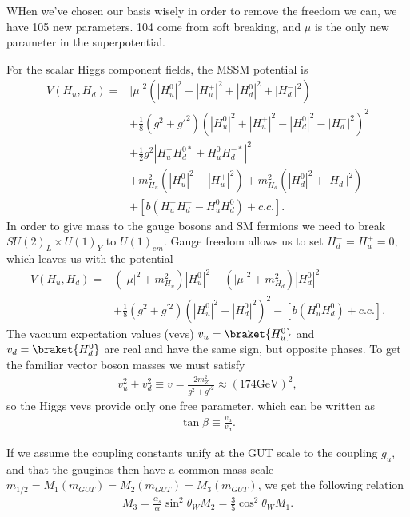 \documentclass[twoside,english]{uiofysmaster}
\begin{document}
WHen we've chosen our basis wisely in order to remove the freedom we can, we have 105 new parameters. 104 come from soft breaking, and $\mu$ is the only new parameter in the superpotential.

For the scalar Higgs component fields, the MSSM potential is
\begin{align*}
V(H_u, H_d) =& |\mu|^2 (|H_u^0|^2 + |H_u^+|^2 + |H_d^0|^2 + |H_d^-|^2)\\
&+ \frac{1}{8} (g^2 + g'^{2})(|H_u^0|^2 + |H_u^+|^2 - |H_d^0|^2 - |H_d^-|^2)^2\\
&+ \frac{1}{2} g^2 |H_u^+H_d^{0*} + H_u^0H_d^{-*}|^2\\
&+ m_{H_u}^2 (|H_u^0|^2 + |H_u^+|^2) + m_{H_d}^2 (|H_d^0|^2 + |H_d^-|^2)\\
&+ [b(H_u^+H_d^- - H_u^0H_d^0) + c.c.].
\end{align*}
In order to give mass to the gauge bosons and SM fermions we need to break $SU(2)_L \times U(1)_Y$ to $U(1)_{em}$. Gauge freedom allows us to set $H_d^- = H_u^+=0$, which leaves us with the potential
\begin{align}
V(H_u, H_d) =& (|\mu|^2 + m_{H_u}^2) |H_u^0|^2 + (|\mu|^2 + m_{H_d}^2) |H_d^0|^2 \\
&+ \frac{1}{8} (g^2 + g^{'2})(|H_u^0|^2  - |H_d^0|^2 )^2- [b(H_u^0H_d^0) + c.c.].
\end{align}
The vacuum expectation values (vevs) $v_u = \braket{H_u^0}$ and $v_d = \braket{H_d^0}$ are real and have the same sign, but opposite phases. To get the familiar vector boson masses we must satisfy
\begin{align*}
v_u^2 + v_d^2 \equiv v = \frac{2m_Z^2}{g^2 + g'^2} \approx (174 \text{GeV})^2,
\end{align*}
so the Higgs vevs provide only one free parameter, which can be written as 
\begin{align*}
\tan \beta \equiv \frac{v_u}{v_d}.
\end{align*}

If we assume the coupling constants unify at the GUT scale to the coupling $g_u$, and that the gauginos then have a common mass scale $m_{1/2} = M_1(m_{GUT}) = M_2(m_{GUT}) = M_3(m_{GUT})$, we get the following relation
\begin{align*}
M_3 = \frac{\alpha_s}{\alpha} \sin^2 \theta_W M_2 = \frac{3}{5} \cos^2 \theta_W M_1.
\end{align*} 
\end{document}
